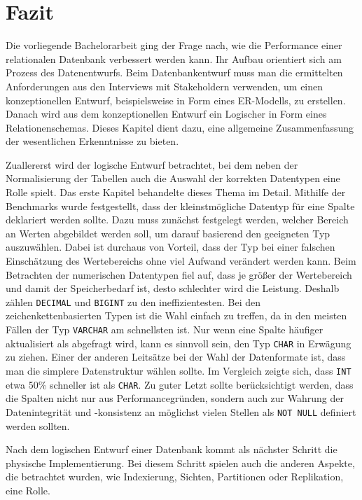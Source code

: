 \chapter{Fazit}\label{ch:fazit}

Die vorliegende Bachelorarbeit ging der Frage nach, wie die Performance einer relationalen Datenbank verbessert werden kann.
Ihr Aufbau orientiert sich am Prozess des Datenentwurfs.
Beim Datenbankentwurf muss man die ermittelten Anforderungen aus den Interviews mit Stakeholdern verwenden, um einen konzeptionellen Entwurf, beispielsweise in Form eines ER-Modells, zu erstellen.
Danach wird aus dem konzeptionellen Entwurf ein Logischer in Form eines Relationenschemas.
Dieses Kapitel dient dazu, eine allgemeine Zusammenfassung der wesentlichen Erkenntnisse zu bieten.

Zuallererst wird der logische Entwurf betrachtet, bei dem neben der Normalisierung der Tabellen auch die Auswahl der korrekten Datentypen eine Rolle spielt.
Das erste Kapitel behandelte dieses Thema im Detail.
Mithilfe der Benchmarks wurde festgestellt, dass der kleinstmögliche Datentyp für eine Spalte deklariert werden sollte.
Dazu muss zunächst festgelegt werden, welcher Bereich an Werten abgebildet werden soll, um darauf basierend den geeigneten Typ auszuwählen.
Dabei ist durchaus von Vorteil, dass der Typ bei einer falschen Einschätzung des Wertebereichs ohne viel Aufwand verändert werden kann.
Beim Betrachten der numerischen Datentypen fiel auf, dass je größer der Wertebereich und damit der Speicherbedarf ist, desto schlechter wird die Leistung.
Deshalb zählen \texttt{DECIMAL} und \texttt{BIGINT} zu den ineffizientesten.
Bei den zeichenkettenbasierten Typen ist die Wahl einfach zu treffen, da in den meisten Fällen der Typ \texttt{VARCHAR} am schnellsten ist.
Nur wenn eine Spalte häufiger aktualisiert als abgefragt wird, kann es sinnvoll sein, den Typ \texttt{CHAR} in Erwägung zu ziehen.
Einer der anderen Leitsätze bei der Wahl der Datenformate ist, dass man die simplere Datenstruktur wählen sollte.
Im Vergleich zeigte sich, dass \texttt{INT} etwa 50\% schneller ist als \texttt{CHAR}.
Zu guter Letzt sollte berücksichtigt werden, dass die Spalten nicht nur aus Performancegründen, sondern auch zur Wahrung der Datenintegrität und -konsistenz an möglichst vielen Stellen als \texttt{NOT NULL} definiert werden sollten.

Nach dem logischen Entwurf einer Datenbank kommt als nächster Schritt die physische Implementierung.
Bei diesem Schritt spielen auch die anderen Aspekte, die betrachtet wurden, wie Indexierung, Sichten, Partitionen oder Replikation, eine Rolle.

